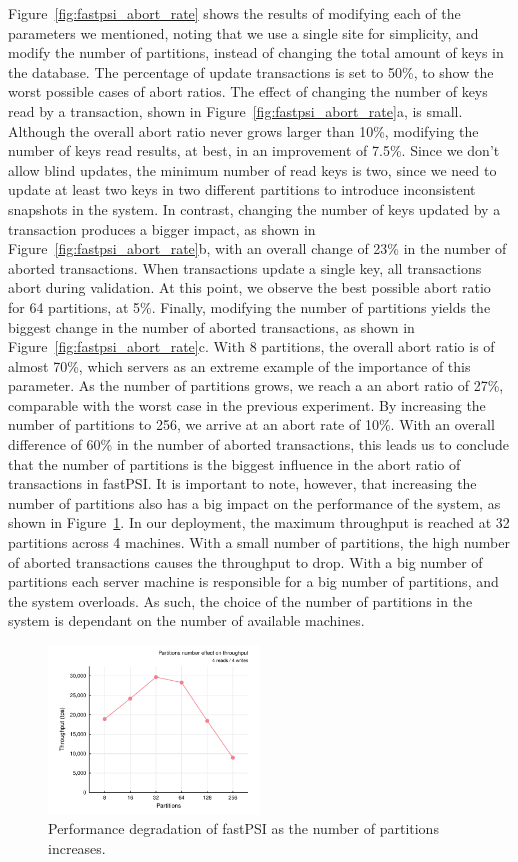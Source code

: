 Figure~\ref{fig:fastpsi_abort_rate} shows the results of modifying each of the parameters we mentioned, noting that we use a single site for simplicity, and modify the number of partitions, instead of changing the total amount of keys in the database. The percentage of update transactions is set to 50\%, to show the worst possible cases of abort ratios. The effect of changing the number of keys read by a transaction, shown in Figure~\ref{fig:fastpsi_abort_rate}a, is small. Although the overall abort ratio never grows larger than 10\%, modifying the number of keys read results, at best, in an improvement of 7.5\%. Since we don't allow blind updates, the minimum number of read keys is two, since we need to update at least two keys in two different partitions to introduce inconsistent snapshots in the system. In contrast, changing the number of keys updated by a transaction produces a bigger impact, as shown in Figure~\ref{fig:fastpsi_abort_rate}b, with an overall change of 23\% in the number of aborted transactions. When transactions update a single key, all transactions abort during validation. At this point, we observe the best possible abort ratio for 64 partitions, at 5\%. Finally, modifying the number of partitions yields the biggest change in the number of aborted transactions, as shown in Figure~\ref{fig:fastpsi_abort_rate}c. With 8 partitions, the overall abort ratio is of almost 70\%, which servers as an extreme example of the importance of this parameter. As the number of partitions grows, we reach a an abort ratio of 27\%, comparable with the worst case in the previous experiment. By increasing the number of partitions to 256, we arrive at an abort rate of 10\%. With an overall difference of 60\% in the number of aborted transactions, this leads us to conclude that the number of partitions is the biggest influence in the abort ratio of transactions in fastPSI. It is important to note, however, that increasing the number of partitions also has a big impact on the performance of the system, as shown in Figure~\ref{fig:fastpsi_partition_throughput}. In our deployment, the maximum throughput is reached at 32 partitions across 4 machines. With a small number of partitions, the high number of aborted transactions causes the throughput to drop. With a big number of partitions each server machine is responsible for a big number of partitions, and the system overloads. As such, the choice of the number of partitions in the system is dependant on the number of available machines.

\begin{figure}[t]
\begin{center}
\includegraphics[width=0.5\textwidth]{figures/psi_partitions_throughput.pdf}
\vspace{-0.75cm}
\end{center}
\caption{Performance degradation of fastPSI as the number of partitions increases.}
\label{fig:fastpsi_partition_throughput}
\end{figure}
